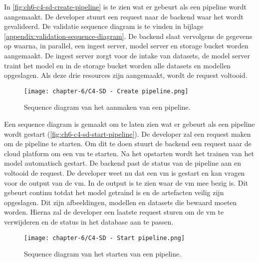 In \autoref{fig:ch6-c4-sd-create-pipeline} is te zien wat er gebeurt als een pipeline wordt aangemaakt. De developer stuurt een request naar de backend waar het wordt gevalideerd. De validatie sequence diagram is te vinden in bijlage \ref{appendix:validation-sequence-diagram}. De backend slaat vervolgens de gegevens op waarna, in parallel, een ingest server, model server en storage bucket worden aangemaakt. De ingest server zorgt voor de intake van datasets, de model server traint het model en in de storage bucket worden alle datasets en modellen opgeslagen. Als deze drie resources zijn aangemaakt, wordt de request voltooid.

\begin{figure}[hbt!]
  \centering
  \texttt{[image: chapter-6/C4-SD - Create pipeline.png]}
  \caption{Sequence diagram van het aanmaken van een pipeline.}
  \label{fig:ch6-c4-sd-create-pipeline}
\end{figure}

\newpage

Een sequence diagram is gemaakt om te laten zien wat er gebeurt als een pipeline wordt gestart (\autoref{fig:ch6-c4-sd-start-pipeline}). De developer zal een request maken om de pipeline te starten. Om dit te doen stuurt de backend een request naar de cloud platform om een \acrfull{vm} te starten. Na het opstarten wordt het trainen van het model automatisch gestart. De backend past de status van de pipeline aan en voltooid de request. De developer weet nu dat een \acrshort{vm} is gestart en kan vragen voor de output van de \acrshort{vm}. In de output is te zien waar de \acrshort{vm} mee bezig is. Dit gebeurt continu totdat het model getraind is en de artefacten veilig zijn opgeslagen. Dit zijn afbeeldingen, modellen en datasets die bewaard moeten worden. Hierna zal de developer een laatste request sturen om de \acrshort{vm} te verwijderen en de status in het database aan te passen. 

\begin{figure}[hbt!]
  \centering
  \texttt{[image: chapter-6/C4-SD - Start pipeline.png]}
  \caption{Sequence diagram van het starten van een pipeline.}
  \label{fig:ch6-c4-sd-start-pipeline}
\end{figure}

